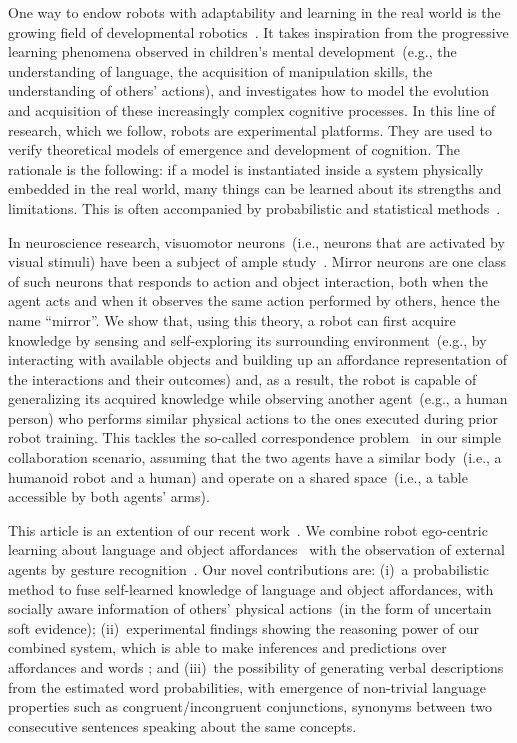 One way to endow robots with adaptability and learning in the real world is the growing field of developmental robotics~\cite{lungarella:2003:devrobsurvey,cangelosi:2015:devrobbook}.
It takes inspiration from the progressive learning phenomena observed in children's mental development~(e.g., the understanding of language, the acquisition of manipulation skills, the understanding of others' actions), and investigates how to model the evolution and acquisition of these increasingly complex cognitive processes.
In this line of research, which we follow, robots are experimental platforms.
They are used to verify theoretical models of emergence and development of cognition.
The rationale is the following: if a model is instantiated inside a system physically embedded in the real world, many things can be learned about its strengths and limitations.
This is often accompanied by probabilistic and statistical methods~\cite{pearl:2014:probabilistic}.

In neuroscience research, visuomotor neurons~(i.e., neurons that are activated by visual stimuli) have been a subject of ample study~\cite{rizzolatti:2001:nrn}.
Mirror neurons are one class of such neurons that responds to action and object interaction, both when the agent acts and when it observes the same action performed by others, hence the name ``mirror''.
We show that, using this theory, a robot can first acquire knowledge by sensing and self-exploring its surrounding environment~(e.g., by interacting with available objects and building up an affordance representation of the interactions and their outcomes) and, as a result, the robot is capable of generalizing its acquired knowledge while observing another agent~(e.g., a human person) who performs similar physical actions to the ones executed during prior robot training.
This tackles the so-called correspondence problem~\cite{nehaniv:2002:correspondence} in our simple collaboration scenario, assuming that the two agents have a similar body~(i.e., a humanoid robot and a human) and operate on a shared space~(i.e., a table accessible by both agents' arms).

This article is an extention of our recent work~\cite{saponaro:2017:glu}.
We combine robot ego-centric learning about language and object affordances~\cite{salvi:2012:smcb} with the observation of external agents by gesture recognition~\cite{saponaro:2013:crhri}.
Our novel contributions are:
(i)~a probabilistic method to fuse self-learned knowledge of language and object affordances, with socially aware information of others' physical actions~(in the form of uncertain soft evidence);
(ii)~experimental findings showing the reasoning power of our combined system, which is able to make inferences and predictions over affordances and words%
; and
(iii)~the possibility of generating verbal descriptions from the estimated word probabilities, with emergence of non-trivial language properties such as congruent/incongruent conjunctions, synonyms between two consecutive sentences speaking about the same concepts.

